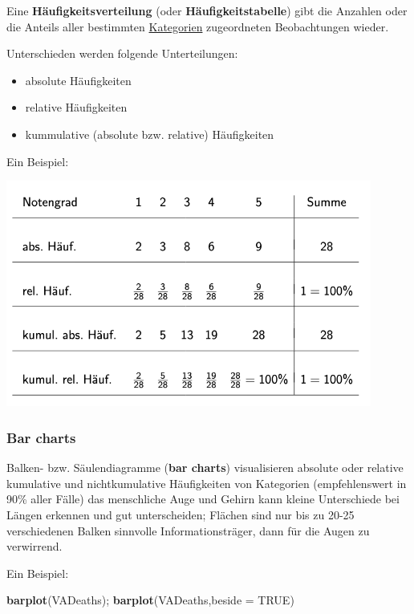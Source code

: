 \documentclass[
]{article}
\newenvironment{Shaded}{\begin{snugshade}}{\end{snugshade}}
\newcommand{\AttributeTok}[1]{\textcolor[rgb]{0.13,0.29,0.53}{#1}}
\newcommand{\ConstantTok}[1]{\textcolor[rgb]{0.56,0.35,0.01}{#1}}
\newcommand{\FunctionTok}[1]{\textcolor[rgb]{0.13,0.29,0.53}{\textbf{#1}}}
\newcommand{\NormalTok}[1]{#1}
\providecommand{\tightlist}{%
  \setlength{\itemsep}{0pt}\setlength{\parskip}{0pt}}
\begin{document}
\tcolorbox

Eine \textbf{Häufigkeitsverteilung} (oder \textbf{Häufigkeitstabelle})
gibt die Anzahlen oder die Anteils aller bestimmten
\underline{Kategorien} zugeordneten Beobachtungen wieder.

\vspace{2mm}

Unterschieden werden folgende Unterteilungen:

\begin{itemize}
\tightlist
\item
  absolute Häufigkeiten
\item
  relative Häufigkeiten
\item
  kummulative (absolute bzw. relative) Häufigkeiten
\end{itemize}

\endtcolorbox

Ein Beispiel:

\includegraphics[width=12cm, center]{Fig1}

\hypertarget{bar-charts}{%
\subsubsection{Bar charts}\label{bar-charts}}

Balken- bzw. Säulendiagramme (\textbf{bar charts}) visualisieren
absolute oder relative kumulative und nichtkumulative Häufigkeiten von
Kategorien (empfehlenswert in 90\% aller Fälle) das menschliche Auge und
Gehirn kann kleine Unterschiede bei Längen erkennen und gut
unterscheiden; Flächen sind nur bis zu 20-25 verschiedenen Balken
sinnvolle Informationsträger, dann für die Augen zu verwirrend.

Ein Beispiel:

\begin{Shaded}
\begin{Highlighting}[]
\FunctionTok{barplot}\NormalTok{(VADeaths); }\FunctionTok{barplot}\NormalTok{(VADeaths,}\AttributeTok{beside =} \ConstantTok{TRUE}\NormalTok{)}
\end{Highlighting}
\end{Shaded}
\end{document}
